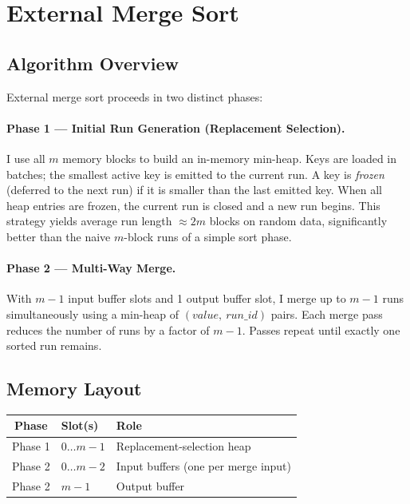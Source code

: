 \documentclass[12pt,a4paper]{article}
\begin{document}
\section{External Merge Sort}

\subsection{Algorithm Overview}

External merge sort proceeds in two distinct phases:

\paragraph{Phase 1 — Initial Run Generation (Replacement Selection).}
I use all $m$ memory blocks to build an in-memory min-heap. Keys are loaded in
batches; the smallest active key is emitted to the current run. A key is
\emph{frozen} (deferred to the next run) if it is smaller than the last emitted
key. When all heap entries are frozen, the current run is closed and a new run
begins. This strategy yields average run length $\approx 2m$ blocks on random
data, significantly better than the naive $m$-block runs of a simple sort phase.

\paragraph{Phase 2 — Multi-Way Merge.}
With $m-1$ input buffer slots and 1 output buffer slot, I merge up to $m-1$
runs simultaneously using a min-heap of $(value,\ run\_id)$ pairs. Each merge
pass reduces the number of runs by a factor of $m-1$. Passes repeat until
exactly one sorted run remains.

\subsection{Memory Layout}

\begin{center}
\begin{tabular}{cll}
\toprule
\textbf{Phase} & \textbf{Slot(s)} & \textbf{Role} \\
\midrule
Phase 1 & $0 \ldots m-1$ & Replacement-selection heap \\
\midrule
Phase 2 & $0 \ldots m-2$ & Input buffers (one per merge input) \\
Phase 2 & $m-1$ & Output buffer \\
\bottomrule
\end{tabular}
\end{center}
\end{document}
